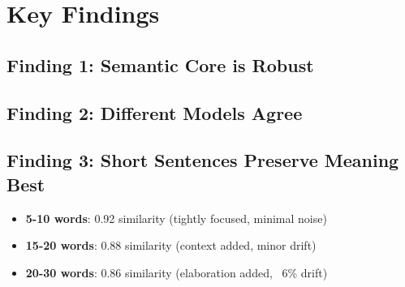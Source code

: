 \documentclass[12pt,a4paper]{report}
\begin{document}
\section{Key Findings}

\subsection{Finding 1: Semantic Core is Robust}

\begin{center}
\end{center}

\subsection{Finding 2: Different Models Agree}

\begin{center}
\end{center}

\subsection{Finding 3: Short Sentences Preserve Meaning Best}

\begin{itemize}
    \item \textbf{5-10 words}: 0.92 similarity (tightly focused, minimal noise)
    \item \textbf{15-20 words}: 0.88 similarity (context added, minor drift)
    \item \textbf{20-30 words}: 0.86 similarity (elaboration added, ~6\% drift)
\end{itemize}

\newpage

\end{document}
